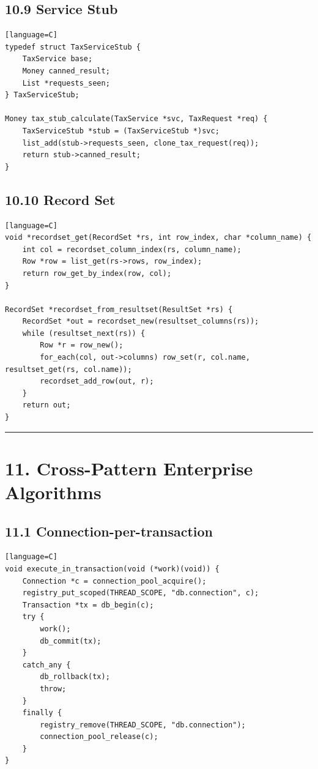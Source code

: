 \documentclass[11pt]{article}
\begin{document}
\subsection{10.9 Service Stub}\label{service-stub}

\begin{verbatim}[language=C]
typedef struct TaxServiceStub {
    TaxService base;
    Money canned_result;
    List *requests_seen;
} TaxServiceStub;

Money tax_stub_calculate(TaxService *svc, TaxRequest *req) {
    TaxServiceStub *stub = (TaxServiceStub *)svc;
    list_add(stub->requests_seen, clone_tax_request(req));
    return stub->canned_result;
}
\end{verbatim}

\subsection{10.10 Record Set}\label{record-set}

\begin{verbatim}[language=C]
void *recordset_get(RecordSet *rs, int row_index, char *column_name) {
    int col = recordset_column_index(rs, column_name);
    Row *row = list_get(rs->rows, row_index);
    return row_get_by_index(row, col);
}

RecordSet *recordset_from_resultset(ResultSet *rs) {
    RecordSet *out = recordset_new(resultset_columns(rs));
    while (resultset_next(rs)) {
        Row *r = row_new();
        for_each(col, out->columns) row_set(r, col.name, resultset_get(rs, col.name));
        recordset_add_row(out, r);
    }
    return out;
}
\end{verbatim}

\begin{center}\rule{0.5\linewidth}{0.5pt}\end{center}

\section{11. Cross-Pattern Enterprise
Algorithms}\label{cross-pattern-enterprise-algorithms}

\subsection{11.1
Connection-per-transaction}\label{connection-per-transaction}

\begin{verbatim}[language=C]
void execute_in_transaction(void (*work)(void)) {
    Connection *c = connection_pool_acquire();
    registry_put_scoped(THREAD_SCOPE, "db.connection", c);
    Transaction *tx = db_begin(c);
    try {
        work();
        db_commit(tx);
    }
    catch_any {
        db_rollback(tx);
        throw;
    }
    finally {
        registry_remove(THREAD_SCOPE, "db.connection");
        connection_pool_release(c);
    }
}
\end{verbatim}
\end{document}
